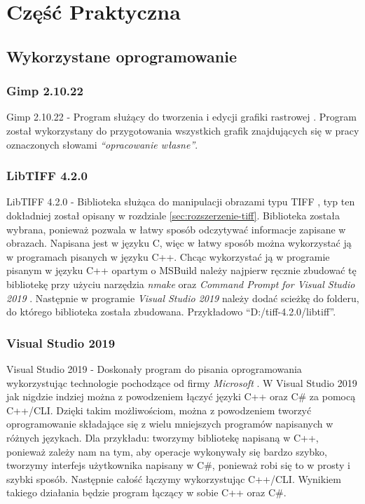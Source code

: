 \documentclass{article}
\begin{document}
    \section{Część Praktyczna}

        \subsection{Wykorzystane oprogramowanie}
        \subsubsection{Gimp 2.10.22}
        {
            \label{sec:gimp}
            \Large
            \justifying
            \quad
            Gimp 2.10.22 - Program służący do tworzenia i edycji grafiki rastrowej \cite{Program GIMP}.
            Program został wykorzystany do przygotowania wszystkich grafik znajdujących się w pracy oznaczonych słowami \emph{``opracowanie własne''}.
        }
        \subsubsection{LibTIFF 4.2.0}
        {
            \label{sec:LibTIFF}
            \Large
            \justifying
            \quad
            LibTIFF 4.2.0 - Biblioteka służąca do manipulacji obrazami typu TIFF \cite{Biblioteka LibTIFF}, typ ten dokładniej został opisany w rozdziale \ref{sec:rozszerzenie-tiff}.
            Biblioteka została wybrana, ponieważ pozwala w łatwy sposób odczytywać informacje zapisane w obrazach.
            Napisana jest w języku C, więc w łatwy sposób można wykorzystać ją w programach pisanych w języku C++.
            Chcąc wykorzystać ją w programie pisanym w języku C++ opartym o MSBuild należy najpierw ręcznie zbudować tę bibliotekę przy użyciu narzędzia \textit{nmake} oraz \textit{Command Prompt for Visual Studio 2019} \cite{Building LibTiff}.
            Następnie w programie \textit{Visual Studio 2019} należy dodać scieżkę do folderu, do którego biblioteka została zbudowana.
            Przykładowo ``D:/tiff-4.2.0/libtiff''.
        }
        \subsubsection{Visual Studio 2019}
        {
            \label{sec:VisualStudio2019}
            \Large
            \justifying
            \quad
            Visual Studio 2019 - Doskonały program do pisania oprogramowania wykorzystując technologie pochodzące od firmy \emph{Microsoft} \cite{VS2019}.
            W Visual Studio 2019 jak nigdzie indziej można z powodzeniem łączyć języki C++ oraz C\# za pomocą C++/CLI.
            Dzięki takim możliwościom, można z powodzeniem tworzyć oprogramowanie składające się z wielu mniejszych programów napisanych w różnych językach.
            Dla przykładu: tworzymy bibliotekę napisaną w C++, ponieważ zależy nam na tym, aby operacje wykonywały się bardzo szybko,
            tworzymy interfejs użytkownika napisany w C\#, ponieważ robi się to w prosty i szybki sposób. Następnie całość łączymy wykorzystując C++/CLI.
            Wynikiem takiego działania będzie program łączący w sobie C++ oraz C\#.
        }
        \newpage
\end{document}
